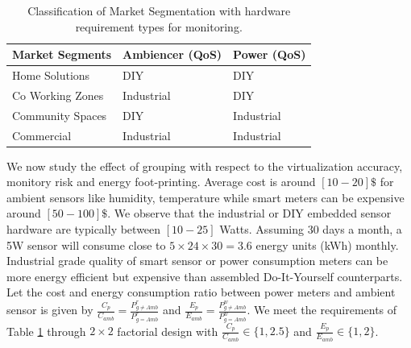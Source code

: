 \begin{table}[]
\begin{tabular}{|l|l|l|}
\hline
      Market Segments           & Ambiencer  (QoS)    & Power (QoS)      \\ \hline
Home Solutions   &  DIY  &  DIY  \\ \hline
Co Working Zones & Industrial & DIY \\ \hline
Community Spaces & DIY & Industrial \\ \hline
Commercial & Industrial & Industrial \\ \hline
\end{tabular}
\caption{Classification of Market Segmentation with hardware requirement types for monitoring.}
\label{table:marketSegment}
\end{table}


We now study the effect of grouping with respect to the virtualization accuracy, monitory risk and energy foot-printing.
Average cost is around $[10-20] \$$ for ambient sensors like humidity, temperature while smart meters can be expensive around $[50-100] \$$.
We observe that the industrial or DIY embedded sensor hardware are typically between $[10-25]$ Watts.
Assuming 30 days a month, a 5W sensor will consume close to $5\times 24 \times 30 = 3.6 $ energy units (kWh) monthly. 
Industrial grade quality of smart sensor or power consumption meters can be more energy efficient but expensive than assembled Do-It-Yourself counterparts. 
Let the cost and energy consumption ratio between power meters and ambient sensor is given by $\frac{C_p}{C_{amb}} = \frac{P^r_{g\neq Amb}}{P^r_{g=Amb}}$ and $\frac{E_p}{E_{amb}} = \frac{P^w_{g\neq Amb}}{P^w_{g=Amb}}$.
We meet the requirements of Table \ref{table:marketSegment} through $2 \times 2$ factorial design with $\frac{C_p}{C_{amb}} \in \{1,2.5\}$ and $\frac{E_p}{E_{amb}} \in \{1,2\}$.

